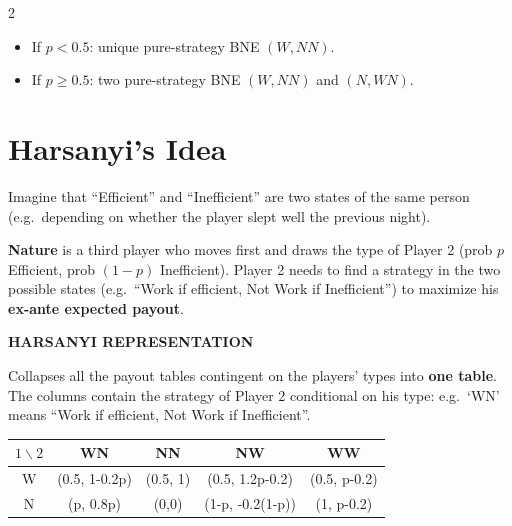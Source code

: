 \documentclass[a4paper,9pt]{extarticle}
\begin{document}
\begin{multicols}{2}
\begin{important}
\begin{itemize}

\item If $p < 0.5$: unique pure-strategy BNE \textbf{$(W, NN)$}.

\item If $p \ge 0.5$: two pure-strategy BNE \textbf{$(W, NN)$} and \textbf{$(N, WN)$}.

\end{itemize}

\end{important}



\section{Harsanyi's Idea}


\begin{important}

Imagine that ``Efficient'' and ``Inefficient'' are two states of the same person (e.g.\
depending on whether the player slept well the previous night).

\textbf{Nature} is a third player who moves first and draws the type of Player 2 (prob $p$
Efficient, prob $(1-p)$ Inefficient). Player 2 needs to find a strategy in the two possible
states (e.g.\ ``Work if efficient, Not Work if Inefficient'') to maximize his
\textbf{ex-ante expected payout}.

\end{important}


\begin{definition}

\textbf{HARSANYI REPRESENTATION}

Collapses all the payout tables contingent on the players' types into \textbf{one table}. The
columns contain the strategy of Player 2 conditional on his type: e.g.\ `WN' means ``Work if
efficient, Not Work if Inefficient''.

\end{definition}


\begin{center}
\footnotesize
\setlength{\tabcolsep}{3pt}
\begin{tabular}{c|cccc}
$1 \backslash 2$ & WN & NN & NW & WW \\
\hline
W & (0.5, 1-0.2p) & (0.5, 1) & (0.5, 1.2p-0.2) & (0.5, p-0.2) \\
N & (p, 0.8p) & (0,0) & (1-p, -0.2(1-p)) & (1, p-0.2) \\
\end{tabular}
\end{center}



\end{multicols}
\end{document}
